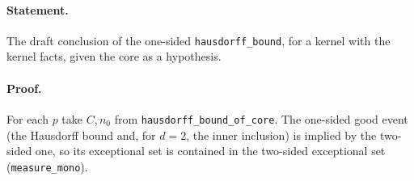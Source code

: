 \paragraph{Statement.} The draft conclusion of the one-sided \texttt{hausdorff\_bound}, for a kernel with the kernel facts, given the core as a hypothesis.
\paragraph{Proof.} For each $p$ take $C,n_0$ from \texttt{hausdorff\_bound\_of\_core}. The one-sided good event (the Hausdorff bound and, for $d=2$, the inner inclusion)
is implied by the two-sided one, so its exceptional set is contained in the two-sided exceptional set (\texttt{measure\_mono}).
